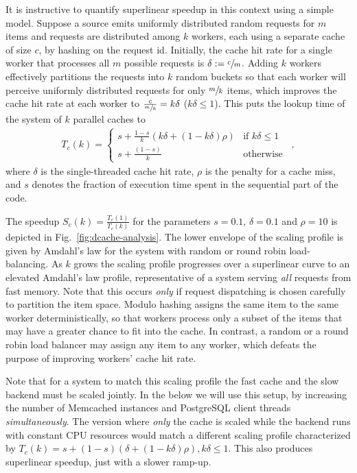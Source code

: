 It is instructive to quantify superlinear speedup in this context using a simple model. Suppose a source emits uniformly distributed random requests for $m$ items and requests are distributed among $k$ workers, each using a separate cache of size $c$, by hashing on the request id.  Initially, the cache hit rate for a single worker that processes all $m$ possible requests is $\delta := \sfrac{c}{m}$. Adding $k$ workers effectively partitions the requests into $k$ random buckets so that each worker will perceive uniformly distributed requests for only $\sfrac{m}{k}$ items, which improves the cache hit rate at each worker to $\frac{c}{\sfrac{m}{k}} = k\delta$ ($k\delta \le 1$). This puts the lookup time of the system of $k$ parallel caches to
\begin{align}\label{eq:dist-cache}
  T_c(k) = \begin{cases} s + \frac{1-s}{k}(k\delta + (1-k\delta)\rho) & \text{if } k\delta \le 1\\s + \frac{(1-s)}{k} & \text{otherwise}\end{cases} \enspace ,
\end{align}
where $\delta$ is the single-threaded cache hit rate, $\rho$ is the penalty for a cache miss, and $s$ denotes the fraction of execution time spent in the sequential part of the code.

The speedup $S_c(k)=\frac{T_c(1)}{T_c(k)}$ for the parameters $s=0.1$, $\delta=0.1$ and $\rho=10$ is depicted in Fig.~\ref{fig:dcache-analysis}. The lower envelope of the scaling profile is given by Amdahl's law for the system with random or round robin load-balancing. %
As $k$ grows the scaling profile progresses over a superlinear curve to an elevated Amdahl's law profile, representative of a system serving \emph{all} requests from fast memory. %
Note that this occurs \emph{only} if request dispatching is chosen carefully to partition the item space. Modulo hashing assigns the same item to the same worker deterministically, so that workers process only a subset of the items that may have a greater chance to fit into the cache. In contrast, a random or a round robin load balancer may assign any item to any worker, which defeats the purpose of improving workers' cache hit rate. %

Note that for a system to match this scaling profile the fast cache and the slow backend must be scaled jointly. In the below we will use this setup, by increasing the number of Memcached instances and PostgreSQL client threads \emph{simultaneously}. The version where \emph{only} the cache is scaled while the backend runs with constant CPU resources would match a different scaling profile characterized by $T_c(k) = s + (1-s)(\delta + (1-k\delta)\rho), k\delta \le 1$. This also produces superlinear speedup, just with a slower ramp-up.

